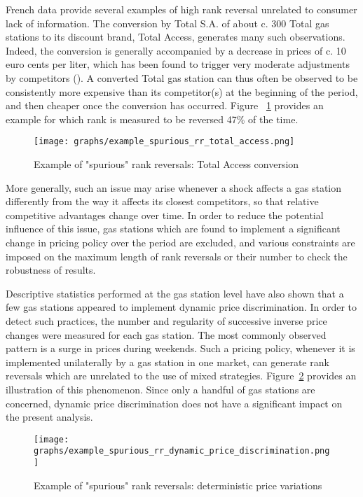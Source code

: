 \documentclass[english]{article}
\begin{document}
French data provide several examples of high rank reversal unrelated to consumer lack of information. The conversion by Total S.A. of about c. 300 Total gas stations to its discount brand, Total Access, generates many such observations. Indeed, the conversion is generally accompanied by a decrease in prices of c. 10 euro cents per liter, which has been found to trigger very moderate adjustments by competitors (\cite{CHA16}). A converted Total gas station can thus often be observed to be consistently more expensive than its competitor(s) at the beginning of the period, and then cheaper once the conversion has occurred. Figure ~\ref{fig:rr_total_access} provides an example for which rank is measured to be reversed 47\% of the time.

\begin{figure}[htb!]
    \caption{Example of "spurious" rank reversals: Total Access conversion}
	\centering
		\texttt{[image: graphs/example\_spurious\_rr\_total\_access.png]}
\label{fig:rr_total_access}
\end{figure}

More generally, such an issue may arise whenever a shock affects a gas station differently from the way it affects its closest competitors, so that relative competitive advantages change over time. In order to reduce the potential influence of this issue, gas stations which are found to implement a significant change in pricing policy over the period are excluded, and various constraints are imposed on the maximum length of rank reversals or their number to check the robustness of results.

Descriptive statistics performed at the gas station level have also shown that a few gas stations appeared to implement dynamic price discrimination. In order to detect such practices, the number and regularity of successive inverse price changes were measured for each gas station. The most commonly observed pattern is a surge in prices during weekends. Such a pricing policy, whenever it is implemented unilaterally by a gas station in one market, can generate rank reversals which are unrelated to the use of mixed strategies. Figure~\ref{fig:rr_dynamic_price_discrimination} provides an illustration of this phenomenon. Since only a handful of gas stations are concerned, dynamic price discrimination does not have a significant impact on the present analysis.

\begin{figure}[htb!]
    \caption{Example of "spurious" rank reversals: deterministic price variations}
	\centering
\texttt{[image: graphs/example\_spurious\_rr\_dynamic\_price\_discrimination.png]}
\label{fig:rr_dynamic_price_discrimination}
\end{figure}
\end{document}
